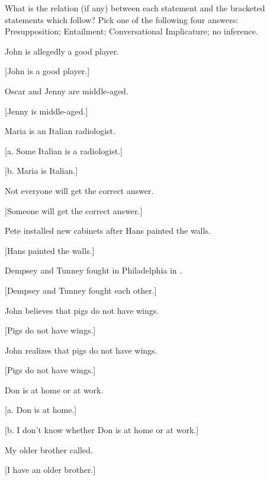 What is the relation (if any) between each statement and the bracketed statements which follow? Pick one of the following four answers:\\
  Presupposition; Entailment; Conversational Implicature; no inference.

\ea%
    \label{ex:key:1}

          John is allegedly a good player.

{}[John is a good player.]
    \z

\ea%
    \label{ex:key:2}
          Oscar and Jenny are middle-aged.

{}[Jenny is middle-aged.]
    \z

\ea%
    \label{ex:key:3}
          Maria is an Italian radiologist.

\ea {}[a. Some Italian is a radiologist.]

\ex {}[b. Maria is Italian.]
    \z \z

\ea%
    \label{ex:key:4}
    Not everyone will get the correct answer.

{}[Someone will get the correct answer.]
    \z

\ea%
    \label{ex:key:5}
    Pete installed new cabinets after Hans painted the walls.

{}[Hans painted the walls.]
    \z

\ea%
    \label{ex:key:6}
          Dempsey and Tunney fought in Philadelphia in \citealt{September1926}.

{}[Dempsey and Tunney fought each other.]
    \z

\ea%
    \label{ex:key:7}
          John believes that pigs do not have wings.

{}[Pigs do not have wings.]
    \z

\ea%
    \label{ex:key:8}




          John realizes that pigs do not have wings.

{}[Pigs do not have wings.]
    \z

\ea%
    \label{ex:key:9}
    Don is at home or at work.

{}[a. Don is at home.]

{}[b. I don't know whether Don is at home or at work.]
    \z

\ea%
    \label{ex:key:10}
          My older brother called.

{}[I have an older brother.]
    \z

\ea%
    \label{ex:key:11}




